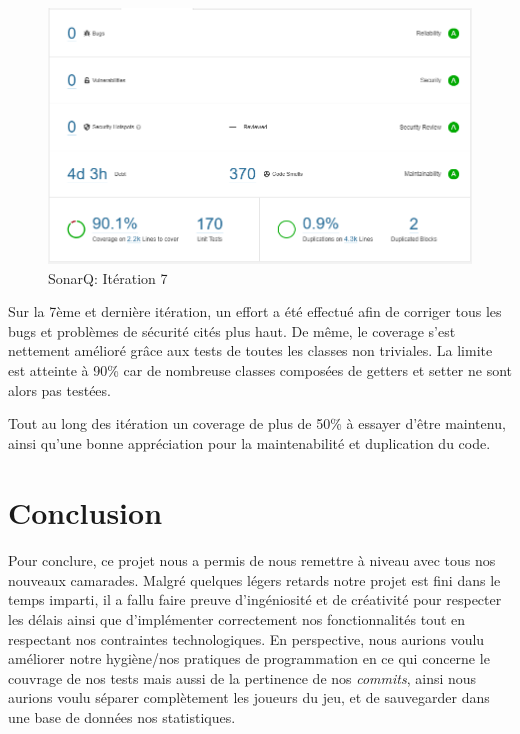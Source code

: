 \documentclass[13pt ,a4paper ]{report}
\begin{document}
\begin{multicols}{2}
      	\paragraph{}
        \begin{figure}[H]
      	\begin{center}
			\includegraphics[scale=0.3]{7.png}
			\caption{SonarQ: Itération 7}
		\end{center}
		\end{figure}
Sur la 7ème et dernière itération, un effort a été effectué afin de corriger tous les bugs et problèmes de sécurité cités plus haut. De même, le coverage s’est nettement amélioré grâce aux tests de toutes les classes non triviales. La limite est atteinte à 90\% car de nombreuse classes composées de getters et setter ne sont alors pas testées.
\newline

Tout au long des itération un coverage de plus de 50\% à essayer d’être maintenu, ainsi qu’une bonne appréciation pour la maintenabilité et duplication du code. 
  


\section*{Conclusion}  
	\paragraph{}
	Pour conclure, ce projet nous a permis de nous remettre à niveau avec tous nos nouveaux camarades. Malgré quelques légers retards notre projet est fini dans le temps imparti, il a fallu faire preuve d’ingéniosité et de créativité pour respecter les délais ainsi que d’implémenter correctement nos fonctionnalités tout en respectant nos contraintes technologiques.
\newline
En perspective, nous aurions voulu améliorer notre hygiène/nos pratiques de programmation en ce qui concerne le couvrage de nos tests mais aussi de la pertinence de nos \textit{commits}, ainsi nous aurions voulu séparer complètement les joueurs du jeu, et de sauvegarder dans une base de données nos statistiques.

\end{multicols}
\end{document}
